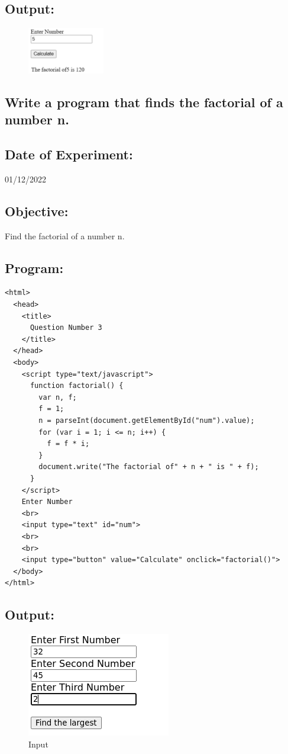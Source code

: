 \documentclass[12pt, a4paper]{article}
\begin{document}
\subsection*{Output:}
\begin{figure}[h]
  \centering
  \includegraphics[width=0.3\textwidth]{43}
\end{figure}

\pagebreak

\begin{tcolorbox}
  \section{Write a program that finds the factorial of a number n.}
\end{tcolorbox}
\subsection*{Date of Experiment:}
01/12/2022
\subsection*{Objective:}
Find the factorial of a number n.

\subsection*{Program:}
\begin{lstlisting}
<html>
  <head>
    <title>
      Question Number 3
    </title>
  </head>
  <body>
    <script type="text/javascript">
      function factorial() {
        var n, f;
        f = 1;
        n = parseInt(document.getElementById("num").value);
        for (var i = 1; i <= n; i++) {
          f = f * i;
        }
        document.write("The factorial of" + n + " is " + f);
      }
    </script>
    Enter Number
    <br>
    <input type="text" id="num">
    <br>
    <br>
    <input type="button" value="Calculate" onclick="factorial()">
  </body>
</html>
\end{lstlisting}
\pagebreak
\subsection*{Output:}
\begin{figure}[h]
  \centering
  \includegraphics{28}
  \caption{Input}
\end{figure}
\end{document}
